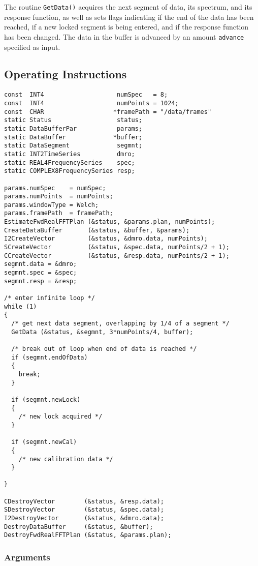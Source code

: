 \documentclass{article}
\begin{document}
The routine \texttt{GetData()} acquires the next segment of data, its
spectrum, and its response function, as well as sets flags indicating if the
end of the data has been reached, if a new locked segment is being entered,
and if the response function has been changed.  The data in the buffer is
advanced by an amount \texttt{advance} specified as input.

\subsection{Operating Instructions}

\begin{verbatim}
const  INT4                    numSpec   = 8;
const  INT4                    numPoints = 1024;
const  CHAR                   *framePath = "/data/frames"
static Status                  status;
static DataBufferPar           params;
static DataBuffer             *buffer;
static DataSegment             segmnt;
static INT2TimeSeries          dmro;
static REAL4FrequencySeries    spec;
static COMPLEX8FrequencySeries resp;

params.numSpec    = numSpec;
params.numPoints  = numPoints;
params.windowType = Welch;
params.framePath  = framePath;
EstimateFwdRealFFTPlan (&status, &params.plan, numPoints);
CreateDataBuffer       (&status, &buffer, &params);
I2CreateVector         (&status, &dmro.data, numPoints);
SCreateVector          (&status, &spec.data, numPoints/2 + 1);
CCreateVector          (&status, &resp.data, numPoints/2 + 1);
segmnt.data = &dmro;
segmnt.spec = &spec;
segmnt.resp = &resp;

/* enter infinite loop */
while (1)
{
  /* get next data segment, overlapping by 1/4 of a segment */
  GetData (&status, &segmnt, 3*numPoints/4, buffer);

  /* break out of loop when end of data is reached */
  if (segmnt.endOfData)
  {
    break;
  }

  if (segmnt.newLock)
  {
    /* new lock acquired */
  }

  if (segmnt.newCal)
  {
    /* new calibration data */
  }

}

CDestroyVector        (&status, &resp.data);
SDestroyVector        (&status, &spec.data);
I2DestroyVector       (&status, &dmro.data);
DestroyDataBuffer     (&status, &buffer);
DestroyFwdRealFFTPlan (&status, &params.plan);
\end{verbatim}

\subsubsection{Arguments}
\end{document}
